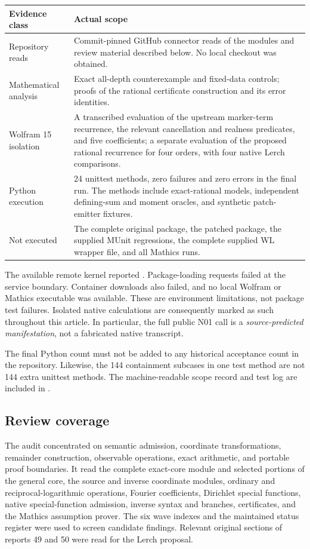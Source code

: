 \documentclass[11pt,a4paper]{article}
\theoremstyle{remark}\newtheorem{remark}[theorem]{Remark}
\newcommand{\code}[1]{\texttt{\detokenize{#1}}}
\begin{document}
\begin{longtable}{@{}p{}p{}@{}}
\toprule
Evidence class & Actual scope\\\midrule\endhead
Repository reads & Commit-pinned GitHub connector reads of the modules and
review material described below. No local checkout was obtained.\\
Mathematical analysis & Exact all-depth counterexample and fixed-data controls;
proofs of the rational certificate construction and its error identities.\\
Wolfram 15 isolation & A transcribed evaluation of the upstream marker-term
recurrence, the relevant cancellation and realness predicates, and five
coefficients; a separate evaluation of the proposed rational recurrence for
four orders, with four native Lerch comparisons.\\
Python execution & 24 unittest methods, zero failures and zero errors in the
final run. The methods include exact-rational models, independent defining-sum
and moment oracles, and synthetic patch-emitter fixtures.\\
Not executed & The complete original package, the patched package, the supplied
MUnit regressions, the complete supplied WL wrapper file, and all Mathics runs.\\
\bottomrule
\end{longtable}

The available remote kernel reported
\code{15.0.0 for Linux x86 (64-bit) (May 6, 2026)}. Package-loading requests
failed at the service boundary. Container downloads also failed, and no local
Wolfram or Mathics executable was available. These are environment limitations,
not package test failures. Isolated native calculations are consequently marked
as such throughout this article. In particular, the full public N01 call is a
\emph{source-predicted manifestation}, not a fabricated native transcript.

The final Python count must not be added to any historical acceptance count in
the repository. Likewise, the 144 containment subcases in one test method are
not 144 extra unittest methods. The machine-readable scope record and test log
are included in \code{evidence/}.

\subsection{Review coverage}

The audit concentrated on semantic admission, coordinate transformations,
remainder construction, observable operations, exact arithmetic, and portable
proof boundaries. It read the complete exact-core module and selected portions
of the general core, the source and inverse coordinate modules, ordinary and
reciprocal-logarithmic operations, Fourier coefficients, Dirichlet special
functions, native special-function admission, inverse syntax and branches,
certificates, and the Mathics assumption prover. The six wave indexes and the
maintained status register were used to screen candidate findings. Relevant
original sections of reports 49 and 50 were read for the Lerch proposal.
\end{document}
